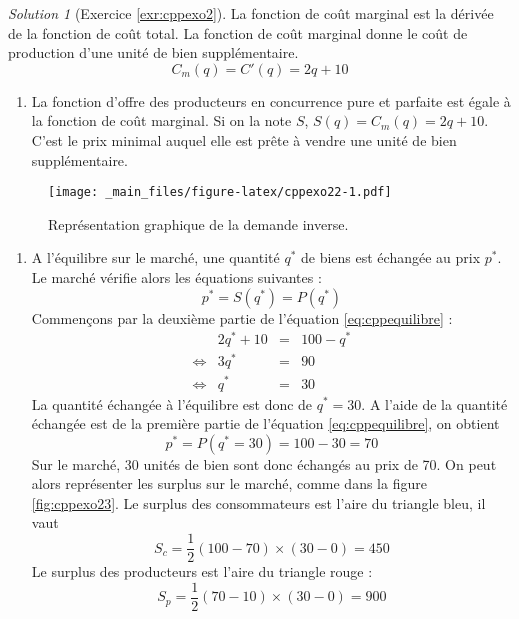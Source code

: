 \documentclass[
]{book}
\providecommand{\tightlist}{%
  \setlength{\itemsep}{0pt}\setlength{\parskip}{0pt}}
\theoremstyle{definition}
\theoremstyle{definition}
\theoremstyle{definition}
\theoremstyle{definition}
\theoremstyle{remark}
\newtheorem*{solution}{Solution}
\begin{document}
\begin{solution}[Exercice \ref{exr:cppexo2}]
La fonction de coût marginal est la dérivée de la fonction de coût total.
La fonction de coût marginal donne le coût de production d'une unité de bien supplémentaire.
\[C_m(q)=C'(q)=2q+10\]

\begin{enumerate}
\def\labelenumi{\arabic{enumi}.}
\setcounter{enumi}{1}
\tightlist
\item
  La fonction d'offre des producteurs en concurrence pure et parfaite est égale à la fonction de coût marginal.
  Si on la note \(S\), \(S(q)=C_m(q) = 2q+10\).
  C'est le prix minimal auquel elle est prête à vendre une unité de bien supplémentaire.
\end{enumerate}

\begin{figure}
\centering
\texttt{[image: \_main\_files/figure-latex/cppexo22-1.pdf]}
\caption{\label{fig:cppexo22}Représentation graphique de la demande inverse.}
\end{figure}

\begin{enumerate}
\def\labelenumi{\arabic{enumi}.}
\setcounter{enumi}{2}
\tightlist
\item
  A l'équilibre sur le marché, une quantité \(q^*\) de biens est échangée au prix \(p^*\).
  Le marché vérifie alors les équations suivantes :
  \begin{equation}
  p^*=S(q^*)=P(q^*)
  \label{eq:cppequilibre}
  \end{equation}
  Commençons par la deuxième partie de l'équation \eqref{eq:cppequilibre} :
  \[
  \begin{array}{crcl}
  &2q^*+10&=&100-q^*\\
  \Leftrightarrow&3q^*&=&90\\
  \Leftrightarrow & q^*&=&30
  \end{array}
  \]
  La quantité échangée à l'équilibre est donc de \(q^*=30\).
  A l'aide de la quantité échangée est de la première partie de l'équation \eqref{eq:cppequilibre}, on obtient
  \[
  p^*=P(q^*=30) = 100-30=70 
  \]
  Sur le marché, 30 unités de bien sont donc échangés au prix de 70.
  On peut alors représenter les surplus sur le marché, comme dans la figure \ref{fig:cppexo23}.
  Le surplus des consommateurs est l'aire du triangle bleu, il vaut
  \[S_c=\frac{1}{2}(100-70)\times(30-0)=450\]
  Le surplus des producteurs est l'aire du triangle rouge :
  \[
  S_p=\frac{1}{2}(70-10)\times(30-0) = 900
  \]
\end{enumerate}


\end{solution}
\end{document}
